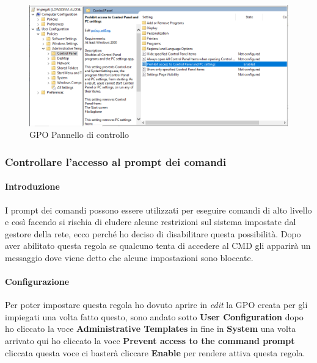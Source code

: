 \documentclass[../main.tex]{subfiles}
\begin{document}
\begin{figure}[h]
    \centering
    \includegraphics[width=1\textwidth]{Images/controlPanel.png}
    \caption{GPO Pannello di controllo}
\end{figure}
\pagebreak{}
\thispagestyle{header-pages}

\subsubsection{Controllare l'accesso al prompt dei comandi}
\paragraph{Introduzione}
I prompt dei comandi possono essere utilizzati per eseguire comandi di alto livello e così facendo si rischia di eludere alcune restrizioni sul sistema impostate dal gestore della rete, ecco perché ho deciso di disabilitare questa possibilità. Dopo aver abilitato questa regola se qualcuno tenta di accedere al CMD gli apparirà un messaggio dove viene detto che alcune impostazioni sono bloccate.



\paragraph{Configurazione}
Per poter impostare questa regola ho dovuto aprire in \textit{edit} la GPO creata per gli impiegati una volta fatto questo, sono andato sotto \textbf{User Configuration} dopo ho cliccato la voce \textbf{Administrative Templates} in fine in \textbf{System} una volta arrivato qui ho cliccato la voce \textbf{Prevent access to the command prompt} cliccata questa voce ci basterà cliccare \textbf{Enable} per rendere attiva questa regola.
\end{document}
